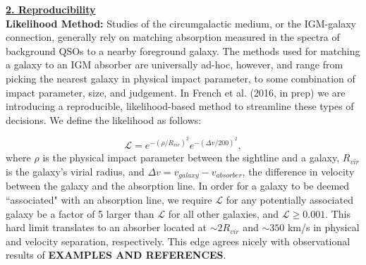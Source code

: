 \documentclass[12pt]{article}
\begin{document}
\noindent \textbf{\underline{2. Reproducibility}}\\

\textbf{Likelihood Method:} Studies of the circumgalactic medium, or the IGM-galaxy connection, generally rely on matching absorption measured in the spectra of background QSOs to a nearby foreground galaxy. The methods used for matching a galaxy to an IGM absorber are universally ad-hoc, however, and range from picking the nearest galaxy in physical impact parameter, to some combination of impact parameter, size, and judgement. In French et al. (2016, in prep) we are introducing a reproducible, likelihood-based method to streamline these types of decisions. We define the likelihood as follows:

\begin{equation}
	\mathcal{L} = e^{-(\rho/R_{vir})^2} e^{-(\Delta v / 200)^2},
\end{equation}
where $\rho$ is the physical impact parameter between the sightline and a galaxy, $R_{vir}$ is the galaxy's virial radius, and $\Delta v = v_{galaxy} - v_{absorber}$, the difference in velocity between the galaxy and the absorption line. In order for a galaxy to be deemed ``associated" with an absorption line, we require $\mathcal{L}$ for any potentially associated galaxy be a factor of 5 larger than $\mathcal{L}$ for all other galaxies, and $\mathcal{L} \geq 0.001$. This hard limit translates to an absorber located at $\sim 2 R_{vir}$ and $\sim 350$ km/s in physical and velocity separation, respectively. This edge agrees nicely with observational results of \textbf{EXAMPLES AND REFERENCES}.\\


\end{document}
